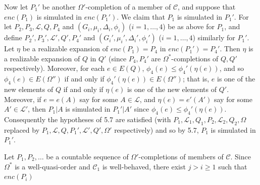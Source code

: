 Now let $P_1'$ be another $\Omega'$-completion of a member of $\mathscr{C}$, and suppose that $enc(P_1)$ is simulated in $enc(P_1')$. We claim that $P_1$ is simulated in $P_1'$. For let $P_2, P_3, \mathscr{L}, Q, P_4$ and $(G_i, \mu_i, \Delta_i, \phi_i)$ ($i = 1, \dots, 4$) be as above for $P_1$, and define $P_2', P_3', \mathscr{L}', Q', P_4'$ and $(G_i', \mu_i', \Delta_i', \phi_i')$ ($i = 1, \dots, 4$) similarly for $P_1'$. Let $\eta$ be a realizable expansion of $enc(P_1) = P_4$ in $enc(P_1') = P_4'$. Then $\eta$ is a realizable expansion of $Q$ in $Q'$ (since $P_4, P_4'$ are $\Omega^*$-completions of $Q, Q'$ respectively). Moreover, for each $e \in E(Q)$, $\phi_4(e) \le \phi_4'(\eta(e))$, and so $\phi_4(e) \in E(\Omega'')$ if and only if $\phi_4'(\eta(e)) \in E(\Omega'')$; that is, $e$ is one of the new elements of $Q$ if and only if $\eta(e)$ is one of the new elements of $Q'$. Moreover, if $e = e(A)$ say for some $A \in \mathscr{L}$, and $\eta(e) = e'(A')$ say for some $A' \in \mathscr{L}'$, then $P_1|A$ is simulated in $P_1'|A'$ since $\phi_4(e) \le \phi_4'(\eta(e))$. Consequently the hypotheses of 5.7 are satisfied (with $P_1, \mathscr{L}_1, Q_1, P_2, \mathscr{L}_2, Q_2, \Omega$ replaced by $P_1, \mathscr{L}, Q, P_1', \mathscr{L}', Q', \Omega'$ respectively) and so by 5.7, $P_1$ is simulated in $P_1'$.

Let $P_1, P_2, \dots$ be a countable sequence of $\Omega'$-completions of members of $\mathscr{C}$. Since $\Omega^*$ is a well-quasi-order and $\mathscr{C}_1$ is well-behaved, there exist $j > i \ge 1$ such that $enc(P_i)$

